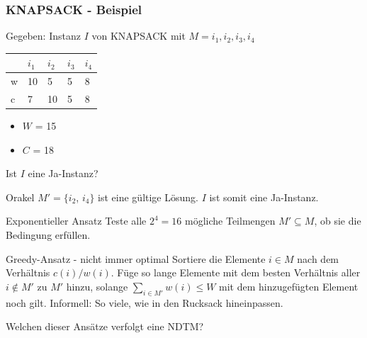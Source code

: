 \begin{frame}
 \frametitle{KNAPSACK - Beispiel}
 Gegeben: Instanz $I$ von KNAPSACK mit $M = {i_1, i_2, i_3, i_4}$
  \begin{center}
\begin{tabular}{l|l|l|l|l}
	  &$i_1$ &$i_2$ &$i_3$ 	&$i_4$\\
  \hline
	w &10	 &5	&5	&8\\
  \hline
	c &7	 &10	&5	&8\\	
\end{tabular}
\end{center}
\begin{itemize}
 \item $W$ = 15
 \item $C$ = 18
\end{itemize}
Ist $I$ eine Ja-Instanz?
\end{frame}

\begin{frame}
\begin{block}{Orakel}
  $M' = \{i_2$, $i_4\}$ ist eine gültige Lösung. $I$ ist somit eine Ja-Instanz.
 \end{block}
\begin{block}{Exponentieller Ansatz}
 Teste alle $2^4 = 16$ mögliche Teilmengen $M' \subseteq M$, ob sie die Bedingung erfüllen. 
\end{block}
\begin{block}{Greedy-Ansatz - nicht immer optimal}
 Sortiere die Elemente $i \in M$ nach dem Verhältnis $c(i)/w(i)$. 
 Füge so lange Elemente mit dem besten Verhältnis aller $i \not\in M'$ zu $M'$ hinzu, solange $\sum_{i \in M'} w(i) \leq W$ mit dem hinzugefügten Element noch gilt.
 Informell: So viele, wie in den Rucksack hineinpassen.
\end{block}
\pause
\begin{block}{}
 Welchen dieser Ansätze verfolgt eine NDTM?
\end{block}

\end{frame}





